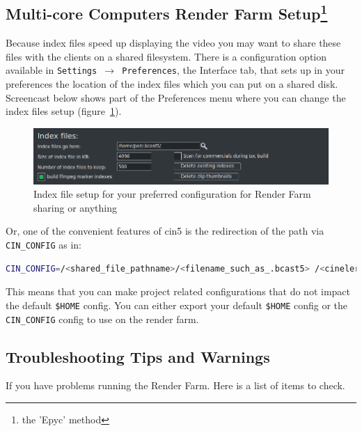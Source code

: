 \subsection{Multi-core Computers Render Farm Setup\protect\footnote{the 'Epyc' method}}%
\label{sub:multi_core_render_farm_setup}

Because index files speed up displaying the video you may want to share these files with the clients on a shared filesystem.  There is a configuration option available in \texttt{Settings $\rightarrow$ Preferences}, the Interface tab, that sets up in your preferences the location of the index files which you can put on a shared disk.
Screencast below shows part of the Preferences menu where you can change the index files setup (figure~\ref{fig:index}).
\begin{figure}[htpb]
    \centering
    \includegraphics[width=0.8\linewidth]{images/index.png}
    \caption{Index file setup for your preferred configuration for Render Farm sharing or anything}
    \label{fig:index}
\end{figure}
 Or, one of the convenient features of cin5 is the redirection of the path via \texttt{CIN\_CONFIG} as in:
\begin{lstlisting}[language=bash,numbers=none]
CIN_CONFIG=/<shared_file_pathname>/<filename_such_as_.bcast5> /<cinelerra_pathname>/cin
\end{lstlisting}
This means that you can make project related configurations that do not impact the default \texttt{\$HOME} config.  You can either export your default \texttt{\$HOME} config or the \texttt{CIN\_CONFIG} config to use on the render farm.

\subsection{Troubleshooting Tips and Warnings}%
\label{sub:troubleshhoting_tips_warnings}

\noindent If you have problems running the Render Farm.  Here is a list of items to check.

